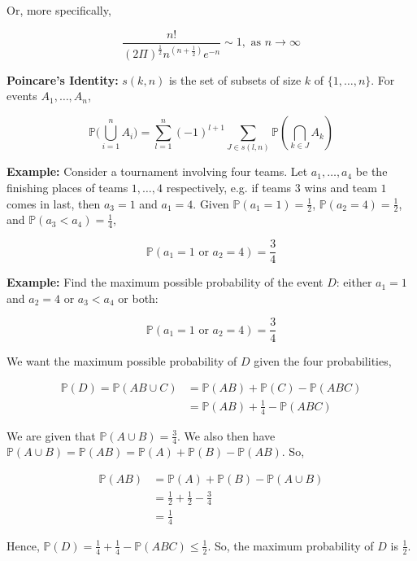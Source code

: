 \documentclass[12pt]{article}
\newcommand{\prob}[1]{\mathbb{P}(#1)}
\begin{document}
\noindent
Or, more specifically, 

\begin{equation*}
\frac{n!}{(2 \Pi)^{\frac{1}{2}}n^{(n + \frac{1}{2})}e^{-n}} \sim 1, \text{ as } n \rightarrow \infty
\end{equation*}

\noindent
\textbf{Poincare's Identity:} $s(k,n)$ is the set of subsets of size $k$ of $\{ 1, \ldots, n \}$. For events $A_1, \ldots, A_n$,

\begin{equation*}
\mathbb{P} \Big ( \bigcup \limits_{i=1}^{n} A_i \Big ) = \sum_{l=1}^{n} (-1)^{l+1} \sum_{J \in s(l, n)} \prob{\bigcap \limits_{k \in J} A_k} 
\end{equation*}

\begin{tcolorbox}
\textbf{Example:} Consider a tournament involving four teams. Let $a_1, \ldots, a_4$ be the finishing places of teams $1, \ldots, 4$ respectively, e.g. if teams $3$ wins and team $1$ comes in last, then $a_3=1$ and $a_1=4$. Given $\prob{a_1=1}=\frac{1}{2}$, $\prob{a_2=4}=\frac{1}{2}$, and $\prob{a_3 < a_4} = \frac{1}{4}$, 

\begin{equation*}
\prob{a_1=1 \text{ or } a_2 = 4} = \frac{3}{4}
\end{equation*}
\end{tcolorbox}

\begin{tcolorbox}
\textbf{Example:} Find the maximum possible probability of the event $D$: either $a_1=1$ and $a_2=4$ or $a_3 < a_4$ or both:

\begin{equation*}
\prob{a_1=1 \text{ or } a_2 = 4} = \frac{3}{4}
\end{equation*}

\noindent
We want the maximum possible probability of $D$ given the four probabilities,

\begin{align*}
\prob{D} = \prob{AB \cup C} & = \prob{AB} + \prob{C} - \prob{ABC} \\
& =  \prob{AB} + \frac{1}{4} - \prob{ABC}
\end{align*}

\noindent
We are given that $\prob{A \cup B} = \frac{3}{4}$. We also then have $\prob{A \cup B} = \prob{AB} = \prob{A} + \prob{B} - \prob{AB}$. So, 

\begin{align*}
\prob{AB} & = \prob{A} + \prob{B} - \prob{A \cup B} \\
& = \frac{1}{2} + \frac{1}{2} - \frac{3}{4} \\
& = \frac{1}{4}
\end{align*}

\noindent
Hence, $\prob{D}=\frac{1}{4} + \frac{1}{4} - \prob{ABC} \leq \frac{1}{2}$. So, the maximum probability of $D$ is $\frac{1}{2}$.  
\end{tcolorbox}
\end{document}
